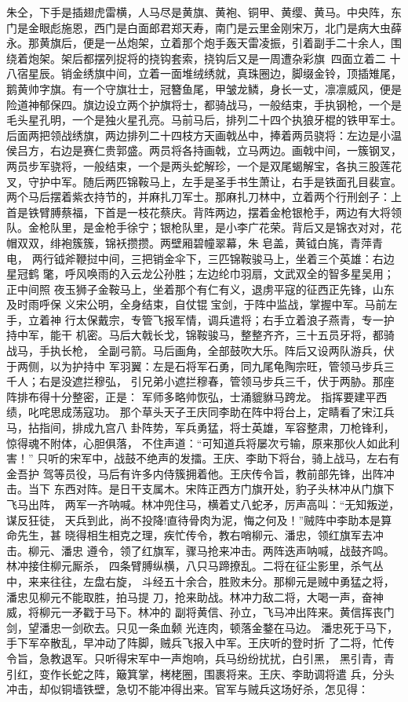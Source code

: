 朱仝，下手是插翅虎雷横，人马尽是黄旗、黄袍、铜甲、黄缨、黄马。中央阵，东
门是金眼彪施恩，西门是白面郎君郑天寿，南门是云里金刚宋万，北门是病大虫薛
永。那黄旗后，便是一丛炮架，立着那个炮手轰天雷凌振，引着副手二十余人，围
绕着炮架。架后都摆列捉将的挠钩套索，挠钩后又是一周遭杂彩旗，四面立着二
十八宿星辰。销金绣旗中间，立着一面堆绒绣就，真珠圈边，脚缀金铃，顶插雉尾，
鹅黄帅字旗。有一个守旗壮士，冠簪鱼尾，甲皱龙鳞，身长一丈，凛凛威风，便是
险道神郁保四。旗边设立两个护旗将士，都骑战马，一般结束，手执钢枪，一个是
毛头星孔明，一个是独火星孔亮。马前马后，排列二十四个执狼牙棍的铁甲军士。
后面两把领战绣旗，两边排列二十四枝方天画戟丛中，捧着两员骁将：左边是小温
侯吕方，右边是赛仁贵郭盛。两员将各持画戟，立马两边。画戟中间，一簇钢叉，
两员步军骁将，一般结束，一个是两头蛇解珍，一个是双尾蝎解宝，各执三股莲花
叉，守护中军。随后两匹锦鞍马上，左手是圣手书生萧让，右手是铁面孔目裴宣。
两个马后摆着紫衣持节的，并麻扎刀军士。那麻扎刀林中，立着两个行刑刽子：上
首是铁臂膊蔡福，下首是一枝花蔡庆。背阵两边，摆着金枪银枪手，两边有大将领
队。金枪队里，是金枪手徐宁；银枪队里，是小李广花荣。背后又是锦衣对对，花
帽双双，绯袍簇簇，锦袄攒攒。两壁厢碧幢翠幕，朱皂盖，黄钺白旄，青萍青电，
两行钺斧鞭挝中间，三把销金伞下，三匹锦鞍骏马上，坐着三个英雄：右边星冠鹤
氅，呼风唤雨的入云龙公孙胜；左边纶巾羽扇，文武双全的智多星吴用；正中间照
夜玉狮子金鞍马上，坐着那个有仁有义，退虏平寇的征西正先锋，山东及时雨呼保
义宋公明，全身结束，自仗锟宝剑，于阵中监战，掌握中军。马前左手，立着神
行太保戴宗，专管飞报军情，调兵遣将；右手立着浪子燕青，专一护持中军，能干
机密。马后大戟长戈，锦鞍骏马，整整齐齐，三十五员牙将，都骑战马，手执长枪，
全副弓箭。马后画角，全部鼓吹大乐。阵后又设两队游兵，伏于两侧，以为护持中
军羽翼：左是石将军石勇，同九尾龟陶宗旺，管领马步兵三千人；右是没遮拦穆弘，
引兄弟小遮拦穆春，管领马步兵三千，伏于两胁。那座阵排布得十分整密，正是：
军师多略帅恢弘，士涌貔貅马跨龙。
指挥要建平西绩，叱咤思成荡寇功。
那个草头天子王庆同李助在阵中将台上，定睛看了宋江兵马，拈指间，排成九宫八
卦阵势，军兵勇猛，将士英雄，军容整肃，刀枪锋利，惊得魂不附体，心胆俱落，
不住声道：“可知道兵将屡次亏输，原来那伙人如此利害！”
只听的宋军中，战鼓不绝声的发擂。王庆、李助下将台，骑上战马，左右有金吾护
驾等员役，马后有许多内侍簇拥着他。王庆传令旨，教前部先锋，出阵冲击。当下
东西对阵。是日干支属木。宋阵正西方门旗开处，豹子头林冲从门旗下飞马出阵，
两军一齐呐喊。林冲兜住马，横着丈八蛇矛，厉声高叫：“无知叛逆，谋反狂徒，
天兵到此，尚不投降!直待骨肉为泥，悔之何及！”贼阵中李助本是算命先生，甚
晓得相生相克之理，疾忙传令，教右哨柳元、潘忠，领红旗军去冲击。柳元、潘忠
遵令，领了红旗军，骤马抢来冲击。两阵迭声呐喊，战鼓齐鸣。林冲接住柳元厮杀，
四条臂膊纵横，八只马蹄撩乱。二将在征尘影里，杀气丛中，来来往往，左盘右旋，
斗经五十余合，胜败未分。那柳元是贼中勇猛之将，潘忠见柳元不能取胜，拍马提
刀，抢来助战。林冲力敌二将，大喝一声，奋神威，将柳元一矛戳于马下。林冲的
副将黄信、孙立，飞马冲出阵来。黄信挥丧门剑，望潘忠一剑砍去。只见一条血颡
光连肉，顿落金鍪在马边。
潘忠死于马下，手下军卒散乱，早冲动了阵脚，贼兵飞报入中军。王庆听的登时折
了二将，忙传令旨，急教退军。只听得宋军中一声炮响，兵马纷纷扰扰，白引黑，
黑引青，青引红，变作长蛇之阵，簸箕掌，栲栳圈，围裹将来。王庆、李助调将遣
兵，分头冲击，却似铜墙铁壁，急切不能冲得出来。官军与贼兵这场好杀，怎见得：

